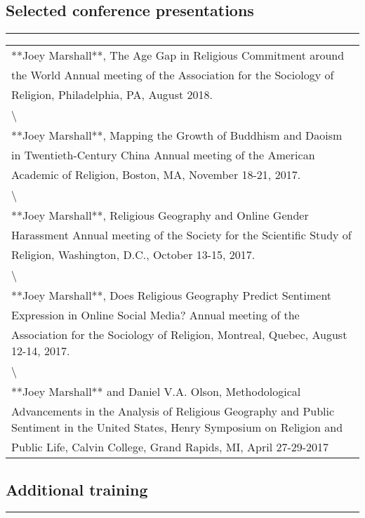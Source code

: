 \documentclass[]{article}
\begin{document}
\subsection{Selected conference
presentations}\label{selected-conference-presentations}

\begin{center}\rule{0.5\linewidth}{\linethickness}\end{center}

\begin{tabular}{l}
\hline
\\
\hline
**Joey Marshall**, The Age Gap in Religious Commitment around the World Annual meeting of the Association for the Sociology of Religion, Philadelphia, PA, August 2018.\\
\hline
\textbackslash{}\\
\hline
**Joey Marshall**, Mapping the Growth of Buddhism and Daoism in Twentieth-Century China Annual meeting of the American Academic of Religion, Boston, MA, November 18-21, 2017.\\
\hline
\textbackslash{}\\
\hline
**Joey Marshall**, Religious Geography and Online Gender Harassment Annual meeting of the Society for the Scientific Study of Religion, Washington, D.C., October 13-15, 2017.\\
\hline
\textbackslash{}\\
\hline
**Joey Marshall**, Does Religious Geography Predict Sentiment Expression in Online Social Media? Annual meeting of the Association for the Sociology of Religion, Montreal, Quebec, August 12-14, 2017.\\
\hline
\textbackslash{}\\
\hline
**Joey Marshall** and Daniel V.A. Olson, Methodological Advancements in the Analysis of Religious Geography and Public Sentiment in the United States, Henry Symposium on Religion and Public Life, Calvin College, Grand Rapids, MI, April 27-29-2017\\
\hline
\end{tabular}

\subsection{Additional training}\label{additional-training}

\begin{center}\rule{0.5\linewidth}{\linethickness}\end{center}
\end{document}
